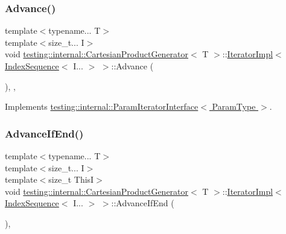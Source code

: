 \subsubsection{\texorpdfstring{Advance()}{Advance()}}
{\footnotesize\ttfamily template$<$typename... T$>$ \\
template$<$size\+\_\+t... I$>$ \\
void \hyperlink{classtesting_1_1internal_1_1CartesianProductGenerator}{testing\+::internal\+::\+Cartesian\+Product\+Generator}$<$ T $>$\+::\hyperlink{classtesting_1_1internal_1_1CartesianProductGenerator_1_1IteratorImpl}{Iterator\+Impl}$<$ \hyperlink{structtesting_1_1internal_1_1IndexSequence}{Index\+Sequence}$<$ I... $>$ $>$\+::Advance (\begin{DoxyParamCaption}{ }\end{DoxyParamCaption})\hspace{0.3cm}{\ttfamily [inline]}, {\ttfamily [override]}, {\ttfamily [virtual]}}



Implements \hyperlink{classtesting_1_1internal_1_1ParamIteratorInterface_a600dbd35fcb551463e379516a1abea48}{testing\+::internal\+::\+Param\+Iterator\+Interface$<$ Param\+Type $>$}.

\mbox{\label{classtesting_1_1internal_1_1CartesianProductGenerator_1_1IteratorImpl_3_01IndexSequence_3_01I_8_8_8_01_4_01_4_a6a5fd8b4a0cd8e27c0ca1fbbfee4f997}} 
\subsubsection{\texorpdfstring{Advance\+If\+End()}{AdvanceIfEnd()}}
{\footnotesize\ttfamily template$<$typename... T$>$ \\
template$<$size\+\_\+t... I$>$ \\
template$<$size\+\_\+t ThisI$>$ \\
void \hyperlink{classtesting_1_1internal_1_1CartesianProductGenerator}{testing\+::internal\+::\+Cartesian\+Product\+Generator}$<$ T $>$\+::\hyperlink{classtesting_1_1internal_1_1CartesianProductGenerator_1_1IteratorImpl}{Iterator\+Impl}$<$ \hyperlink{structtesting_1_1internal_1_1IndexSequence}{Index\+Sequence}$<$ I... $>$ $>$\+::Advance\+If\+End (\begin{DoxyParamCaption}{ }\end{DoxyParamCaption})\hspace{0.3cm}{\ttfamily [inline]}, {\ttfamily [private]}}

